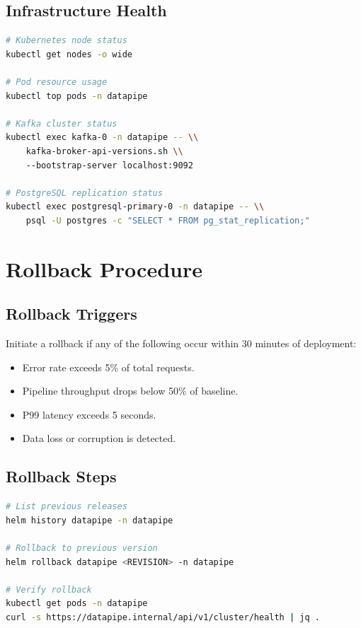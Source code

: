 \documentclass[
    language=english,
    doctype=manual,
    institution=none,
    titlestyle=book,
    oneside,
]{../../omnilatex}
\begin{document}
\section{Infrastructure Health}

\begin{lstlisting}[language=bash, caption={Infrastructure health verification.}]
# Kubernetes node status
kubectl get nodes -o wide

# Pod resource usage
kubectl top pods -n datapipe

# Kafka cluster status
kubectl exec kafka-0 -n datapipe -- \\
    kafka-broker-api-versions.sh \\
    --bootstrap-server localhost:9092

# PostgreSQL replication status
kubectl exec postgresql-primary-0 -n datapipe -- \\
    psql -U postgres -c "SELECT * FROM pg_stat_replication;"
\end{lstlisting}

\chapter{Rollback Procedure}
\label{sec:rollback}

\section{Rollback Triggers}

Initiate a rollback if any of the following occur within 30 minutes of
deployment:

\begin{itemize}
    \item Error rate exceeds 5\% of total requests.
    \item Pipeline throughput drops below 50\% of baseline.
    \item P99 latency exceeds 5 seconds.
    \item Data loss or corruption is detected.
\end{itemize}

\section{Rollback Steps}

\begin{lstlisting}[language=bash, caption={Helm rollback procedure.}]
# List previous releases
helm history datapipe -n datapipe

# Rollback to previous version
helm rollback datapipe <REVISION> -n datapipe

# Verify rollback
kubectl get pods -n datapipe
curl -s https://datapipe.internal/api/v1/cluster/health | jq .
\end{lstlisting}
\end{document}
